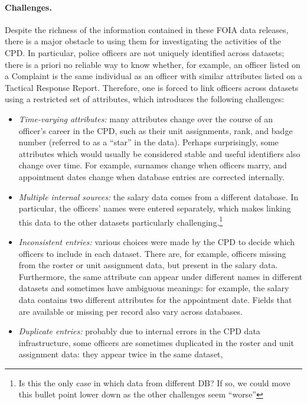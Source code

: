 \paragraph{Challenges.}
Despite the richness of the information contained in these FOIA data releases,
there is a major obstacle to using them for investigating the activities of the
CPD. In particular, police officers are not uniquely identified across datasets; there is
a priori no reliable way to know whether, for example, an officer listed on
a Complaint is the same individual as an officer with similar attributes listed
on a Tactical Response Report. Therefore, one is forced to link officers
across datasets using a restricted set of attributes, 
which introduces the following challenges:
\begin{itemize}
	\item \emph{Time-varying attributes:} many attributes change over the
		course of an officer's career in the CPD, such as their unit
		assignments, rank, and badge number (referred to as a ``star'' in the data). 
                Perhaps surprisingly, some
		attributes which would usually be considered stable and useful
		identifiers also change over time. For example, surnames change when
		officers marry, and appointment dates change when database entries are
		corrected internally.
	\item \emph{Multiple internal sources:} the salary data comes from
		a different database. In particular, the officers' names were entered
		separately, which makes linking this data to the other datasets
		particularly challenging.\footnote{Is this the only case in which data from different DB? If so, we could move this bullet point lower down as the other challenges seem ``worse''}
	\item \emph{Inconsistent entries:} various choices were made by the CPD to
		decide which officers to include in each dataset.  There are, for
		example, officers missing from the roster or unit assignment data, but
		present in the salary data. Furthermore, the same attribute can appear
		under different names in different datasets and sometimes have
		ambiguous meanings: for example, the salary data contains two different
		attributes for the appointment date. Fields that are available or missing
		per record also vary across databases.
	\item \emph{Duplicate entries:} probably due to internal errors in the CPD
		data infrastructure, some officers are sometimes duplicated in the
		roster and unit assignment data: they appear twice in the same dataset,

\end{itemize}
